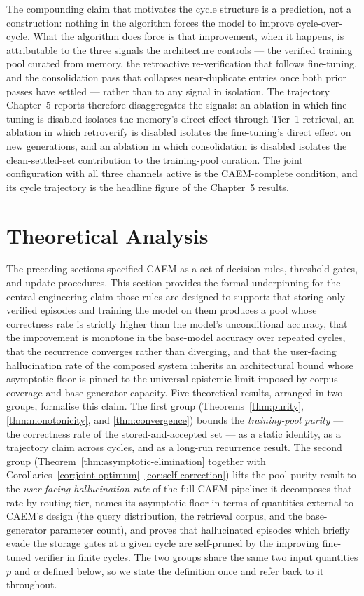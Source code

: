 The compounding claim that motivates the cycle structure is a prediction, not a construction: nothing in the algorithm forces the model to improve cycle-over-cycle. What the algorithm does force is that improvement, when it happens, is attributable to the three signals the architecture controls --- the verified training pool curated from memory, the retroactive re-verification that follows fine-tuning, and the consolidation pass that collapses near-duplicate entries once both prior passes have settled --- rather than to any signal in isolation. The trajectory Chapter~5 reports therefore disaggregates the signals: an ablation in which fine-tuning is disabled isolates the memory's direct effect through Tier~1 retrieval, an ablation in which retroverify is disabled isolates the fine-tuning's direct effect on new generations, and an ablation in which consolidation is disabled isolates the clean-settled-set contribution to the training-pool curation. The joint configuration with all three channels active is the CAEM-complete condition, and its cycle trajectory is the headline figure of the Chapter~5 results.

\section{Theoretical Analysis}
\label{sec:theoretical-analysis}

The preceding sections specified CAEM as a set of decision rules, threshold gates, and update procedures. This section provides the formal underpinning for the central engineering claim those rules are designed to support: that storing only verified episodes and training the model on them produces a pool whose correctness rate is strictly higher than the model's unconditional accuracy, that the improvement is monotone in the base-model accuracy over repeated cycles, that the recurrence converges rather than diverging, and that the user-facing hallucination rate of the composed system inherits an architectural bound whose asymptotic floor is pinned to the universal epistemic limit imposed by corpus coverage and base-generator capacity. Five theoretical results, arranged in two groups, formalise this claim. The first group (Theorems~\ref{thm:purity}, \ref{thm:monotonicity}, and \ref{thm:convergence}) bounds the \emph{training-pool purity} --- the correctness rate of the stored-and-accepted set --- as a static identity, as a trajectory claim across cycles, and as a long-run recurrence result. The second group (Theorem~\ref{thm:asymptotic-elimination} together with Corollaries~\ref{cor:joint-optimum}--\ref{cor:self-correction}) lifts the pool-purity result to the \emph{user-facing hallucination rate} of the full CAEM pipeline: it decomposes that rate by routing tier, names its asymptotic floor in terms of quantities external to CAEM's design (the query distribution, the retrieval corpus, and the base-generator parameter count), and proves that hallucinated episodes which briefly evade the storage gates at a given cycle are self-pruned by the improving fine-tuned verifier in finite cycles. The two groups share the same two input quantities $p$ and $\alpha$ defined below, so we state the definition once and refer back to it throughout.

